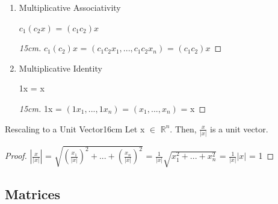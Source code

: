 \begin{enumerate}[label=(\alph*), leftmargin=2cm, itemsep=0.1cm]
        \item {\color{lgreen} Multiplicative Associativity}
        
            \hspace{0.5cm}
            $c_1(c_2x)$ = $(c_1c_2)x$

            \begin{proof}[15cm]
                $c_1(c_2)x$
                = $(c_1c_2x_1,...,c_1c_2x_n)$
                = $(c_1c_2)x$
            \end{proof}

        \item {\color{lgreen} Multiplicative Identity}
        
            \hspace{0.5cm}
            1x = x

            \begin{proof}[15cm]
                1x
                = $(1x_1,...,1x_n)$
                = $(x_1,...,x_n)$
                = x
            \end{proof}
    \end{enumerate}

    \vspace{0.5cm}



    \begin{wtheorem}{Rescaling to a Unit Vector}{16cm}
        Let x $\in$ $\mathbb{R}^n$. Then, $\frac{x}{|x|}$ is a unit vector.
    \end{wtheorem}

    \begin{proof}
        $|\frac{x}{|x|}|$
        = $\sqrt{(\frac{x_1}{|x|})^2 + ... + (\frac{x_n}{|x|})^2}$
        = $\frac{1}{|x|} \sqrt{x_1^2 + ... + x_n^2}$
        = $\frac{1}{|x|} |x|$
        = 1
    \end{proof}

    \vspace{0.5cm}

    



\subsection{ Matrices }

